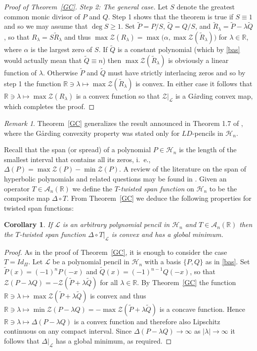 \documentclass[10pt,twoside,a4paper,reqno]{amsart}
\theoremstyle{plain}
\newtheorem{coro+}           {Corollary}
\theoremstyle{definition}
\theoremstyle{remark}
\newtheorem{rema+}           {Remark}
\newenvironment{corollary}{\begin{coro+}}{\end{coro+}}
\newenvironment{remark}{\begin{rema+}}{\end{rema+}}
\newcommand {\bR} {\mathbb {R}}
\newcommand {\al} {\alpha}
\newcommand {\la} {\lambda}
\newcommand {\De} {\Delta}
\newcommand {\calL} {\mathcal {L}}
\newcommand {\calH} {\mathcal {H}}
\newcommand {\calA} {\mathcal {A}}
\newcommand {\calZ} {\mathcal {Z}}
\newcommand {\vP} {\varPi}
\begin{document}
\begin{proof}[Proof of Theorem~\ref{GC}]
{\em Step 2: The general case.} Let $S$ denote the greatest common monic 
divisor of $P$ and $Q$. Step 1 shows that the theorem is true if $S\equiv 1$ 
and so we may assume that $\deg S\ge 1$. Set $\tilde{P}=P/S$, 
$\tilde{Q}=Q/S$, and $\tilde{R}_{\la}=\tilde{P}-\la \tilde{Q}$, so that 
$R_{\la}=S\tilde{R}_{\la}$ and thus
$\max \calZ(R_{\la})=\max \big(\al, \max \calZ(\tilde{R}_{\la})\big)$ for 
$\la \in \bR$, where 
$\al$ is the largest zero of $S$. If $\tilde{Q}$ is a constant polynomial 
(which by \eqref{bas} would actually mean that $\tilde{Q}\equiv n$) then 
$\max \calZ(\tilde{R}_{\la})$ is obviously a linear function of $\la$. 
Otherwise $\tilde{P}$ and $\tilde{Q}$ must have strictly interlacing zeros 
and so by step 1 the function $\bR\ni \la\mapsto \max \calZ(\tilde{R}_{\la})$ 
is convex.
In either case it follows that $\bR\ni \la\mapsto \max \calZ(R_{\la})$ is a 
convex function so that $\calZ|_{\calL}$ is a G\aa rding convex map, which 
completes the proof.
\end{proof}

\begin{remark}\label{rem1}
Theorem~\ref{GC} generalizes the result announced in Theorem 1.7 of \cite{BS2},
where the G\aa rding convexity property was stated only for $LD$-pencils in 
$\calH_n$.  
\end{remark}

Recall that the span (or spread) of a polynomial $P\in \calH_n$ is 
the length of the smallest interval that contains all its zeros, 
i.~e., $\De(P)=\max \calZ(P)-\min \calZ(P)$. A review of the literature on 
the span of hyperbolic polynomials and related questions may be found in 
\cite[Ch.~6]{RS}. Given an operator $T\in \calA_n(\bR)$ we define the 
$T$-{\em twisted span function} on $\calH_n$ to be the composite map 
$\De\circ T$. From Theorem~\ref{GC} we deduce the following 
properties for twisted span functions:

\begin{corollary}\label{t-span}
If $\calL$ is an arbitrary polynomial pencil in $\calH_n$ and 
$T\in \calA_n(\bR)$ then the $T$-twisted span function 
$\De\circ T|_{\calL}$ is convex and has a global minimum. 
\end{corollary}

\begin{proof}
As in the proof of Theorem~\ref{GC}, it is enough to consider the case 
$T=Id_{\vP}$. Let $\calL$ be a polynomial pencil in $\calH_n$ with a basis 
$\{P,Q\}$ as in \eqref{bas}. Set $\tilde{P}(x)=(-1)^nP(-x)$ and 
$\tilde{Q}(x)=(-1)^{n-1}Q(-x)$, so that $\calZ(P-\la Q)=
-\calZ(\tilde{P}+\la \tilde{Q})$ for all $\la\in \bR$. By Theorem~\ref{GC} the 
function $\bR\ni \la\mapsto \max\calZ(\tilde{P}+\la \tilde{Q})$ is convex 
and thus $\bR\ni \la\mapsto \min\calZ(P-\la Q)=-\max\calZ(\tilde{P}+
\la \tilde{Q})$ is a concave function. Hence $\bR\ni \la\mapsto \De(P-\la Q)$ 
is a convex function and therefore also Lipschitz continuous on any compact 
interval. Since $\De(P-\la Q)\rightarrow \infty$ as $|\la|\rightarrow \infty$ 
it follows that $\De|_{\calL}$ has a global minimum, as required.
\end{proof}
\end{document}
